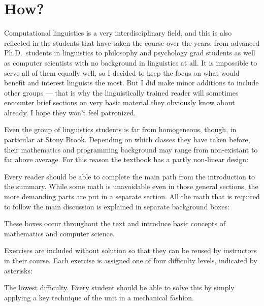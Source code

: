 \section*{How?}

Computational linguistics is a very interdisciplinary field, and this is also reflected in the students that have taken the course over the years: from advanced Ph.D.~students in linguistics to philosophy and psychology grad students as well as computer scientists with no background in linguistics at all.
It is impossible to serve all of them equally well, so I decided to keep the focus on what would benefit and interest linguists the most.
But I did make minor additions to include other groups --- that is why the linguistically trained reader will sometimes encounter brief sections on very basic material they obviously know about already.
I hope they won't feel patronized.

Even the group of linguistics students is far from homogeneous, though, in particular at Stony Brook.
Depending on which classes they have taken before, their mathematics and programming background may range from non-existant to far above average.
For this reason the textbook has a partly non-linear design:

\begin{center}
\end{center}

Every reader should be able to complete the main path from the introduction to the summary.
While some math is unavoidable even in those general sections, the more demanding parts are put in a separate section.
All the math that is required to follow the main discussion is explained in separate background boxes:

\begin{techinfo}
These boxes occur throughout the text and introduce basic concepts of mathematics and computer science.
\end{techinfo}

Exercises are included without solution so that they can be reused by instructors in their course.
Each exercise is assigned one of four difficulty levels, indicated by asterisks:

\begin{homework}
    The lowest difficulty.
    Every student should be able to solve this by simply applying a key technique of the unit in a mechanical fashion.
\end{homework}

